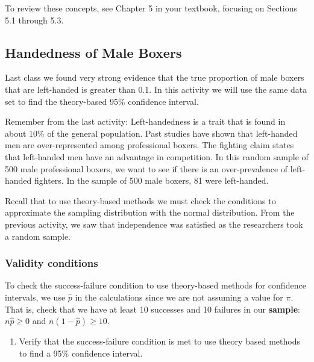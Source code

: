 \documentclass[
]{report}
\providecommand{\tightlist}{%
  \setlength{\itemsep}{0pt}\setlength{\parskip}{0pt}}
\begin{document}
To review these concepts, see Chapter 5 in your textbook, focusing on Sections 5.1 through 5.3.

\hypertarget{handedness-of-male-boxers-1}{%
\subsection{Handedness of Male Boxers}\label{handedness-of-male-boxers-1}}

Last class we found very strong evidence that the true proportion of male boxers that are left-handed is greater than 0.1. In this activity we will use the same data set to find the theory-based 95\% confidence interval.

Remember from the last activity: Left-handedness is a trait that is found in about 10\% of the general population. Past studies have shown that left-handed men are over-represented among professional boxers. The fighting claim states that left-handed men have an advantage in competition. In this random sample of 500 male professional boxers, we want to see if there is an over-prevalence of left-handed fighters. In the sample of 500 male boxers, 81 were left-handed.

Recall that to use theory-based methods we must check the conditions to approximate the sampling distribution with the normal distribution. From the previous activity, we saw that independence was satisfied as the researchers took a random sample.

\hypertarget{validity-conditions}{%
\subsubsection*{Validity conditions}\label{validity-conditions}}

To check the success-failure condition to use theory-based methods for confidence intervals, we use \(\hat{p}\) in the calculations since we are not assuming a value for \(\pi\). That is, check that we have at least 10 successes and 10 failures in our \textbf{sample}: \(n\hat{p} \geq 0\) and \(n(1-\hat{p}) \geq 10\).

\begin{enumerate}
\def\labelenumi{\arabic{enumi}.}
\tightlist
\item
  Verify that the success-failure condition is met to use theory based methods to find a 95\% confidence interval.
\end{enumerate}

\vspace{0.5in}
\newpage
\end{document}
